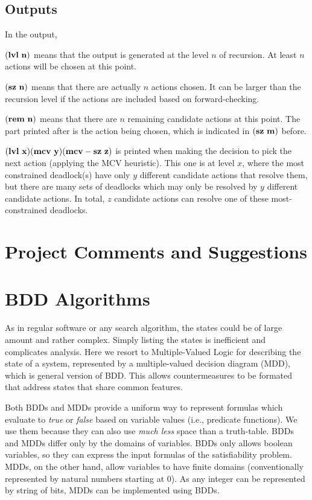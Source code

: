 \subsection{Outputs}
In the output, 

$\bf{(lvl\ n)}$ means that the output is generated at the level $n$ of recursion. At least $n$ actions will be chosen at this point.

$\bf{(sz\ n)}$ means that there are actually $n$ actions chosen. It can be larger than the recursion level if the actions are included based on forward-checking.

$\bf{(rem\ n)}$ means that there are $n$ remaining candidate actions at this point. The part printed after is the action being chosen, which is indicated in $\bf{(sz\ m)}$ before. 

$\bf{(lvl\ x) (mcv\ y) (mcv-sz\ z)}$ is printed when making the decision to pick the next action (applying the MCV heuristic). This one is at level $x$, where the most constrained deadlock(s) have only $y$ different candidate actions that resolve them, but there are many sets of deadlocks which may only be resolved by $y$ different candidate actions. In total, $z$ candidate actions can resolve one of these most-constrained deadlocks.

\section{Project Comments and Suggestions}





\section{BDD Algorithms}
As in regular software or any search algorithm, the states could be of large amount and rather complex. Simply listing the states is inefficient and complicates analysis. Here we resort to Multiple-Valued Logic for describing the state of a system, represented by a multiple-valued decision diagram (MDD), which is general version of BDD. This allows countermeasures to be formated that address states that share common features. 

Both BDDs and MDDs provide a uniform way to represent formulas which evaluate to {\it true} or {\it false} based on variable values (i.e., predicate functions).
We use them because they can also use {\em much less} space than a truth-table.
BDDs and MDDs differ only by the domains of variables. BDDs only allows boolean variables, so they can express the input formulas of the satisfiability problem.
MDDs, on the other hand, allow variables to have finite domains (conventionally represented by natural numbers starting at $0$).
As any integer can be represented by string of bits, MDDs can be implemented using BDDs.

